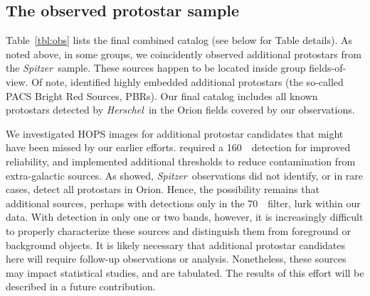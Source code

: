 \documentclass[manuscript]{aastex61}
\newcommand{\herschel}{{\em Herschel}}
\newcommand{\spitzer}{{\em Spitzer}}
\begin{document}
\subsection{The observed protostar sample}
\label{sec:protostars}
Table~\ref{tbl:obs} lists the final combined catalog (see below for Table details).  As noted above, in some groups, we coincidently observed additional protostars from the \citet{orion} \spitzer\ sample.  These sources happen to be located inside group fields-of-view.   Of note, \citet{pbrpaper} identified highly embedded additional protostars (the so-called PACS Bright Red Sources, PBRs).  Our final catalog includes all known protostars detected by \herschel\ in the Orion fields covered by our observations.
\par
We investigated HOPS images for additional protostar candidates that might have been missed by our earlier efforts.  \citet{pbrpaper} required a 160~\micron\ detection for improved reliability, and implemented additional thresholds to reduce contamination from extra-galactic sources.  As \citet{pbrpaper} showed, \spitzer\ observations did not identify, or in rare cases, detect all protostars in Orion.  Hence, the possibility remains that additional sources, perhaps with detections only in the 70~\micron\ filter, lurk within our data.  With detection in only one or two bands, however, it is increasingly difficult to properly characterize these sources and distinguish them from foreground or background objects.  It is likely necessary that additional protostar candidates here will require follow-up observations or analysis.  Nonetheless, these sources may impact statistical studies, and are tabulated.  The results of this effort will be described in a future contribution.
\par
\end{document}
